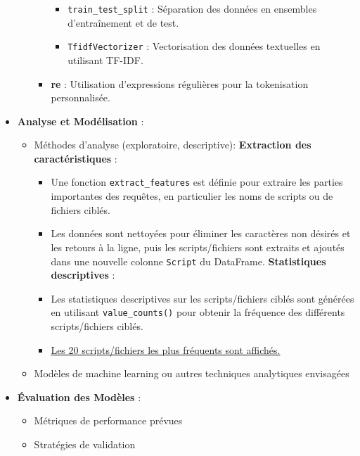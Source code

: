 \documentclass[
  letterpaper,
  DIV=11,
  numbers=noendperiod]{scrartcl}
\providecommand{\tightlist}{%
  \setlength{\itemsep}{0pt}\setlength{\parskip}{0pt}}\usepackage{longtable,booktabs,array}
\begin{document}
\begin{itemize}
\begin{itemize}
\begin{itemize}
      \begin{itemize}
      \tightlist
      \item
        \texttt{train\_test\_split} : Séparation des données en
        ensembles d'entraînement et de test.
      \item
        \texttt{TfidfVectorizer} : Vectorisation des données textuelles
        en utilisant TF-IDF.
      \end{itemize}
    \item
      \textbf{re} : Utilisation d'expressions régulières pour la
      tokenisation personnalisée.
    \end{itemize}
  \end{itemize}
\item
  \textbf{Analyse et Modélisation} :

  \begin{itemize}
  \tightlist
  \item
    Méthodes d'analyse (exploratoire, descriptive): \textbf{Extraction
    des caractéristiques} :

    \begin{itemize}
    \tightlist
    \item
      Une fonction \texttt{extract\_features} est définie pour extraire
      les parties importantes des requêtes, en particulier les noms de
      scripts ou de fichiers ciblés.
    \item
      Les données sont nettoyées pour éliminer les caractères non
      désirés et les retours à la ligne, puis les scripts/fichiers sont
      extraits et ajoutés dans une nouvelle colonne \texttt{Script} du
      DataFrame. \textbf{Statistiques descriptives} :
    \item
      Les statistiques descriptives sur les scripts/fichiers ciblés sont
      générées en utilisant \texttt{value\_counts()} pour obtenir la
      fréquence des différents scripts/fichiers ciblés.
    \item
      \href{images/Fréquence\%20des\%20fichiers\%20scripts\%20ciblés.png}{Les
      20 scripts/fichiers les plus fréquents sont affichés.}
    \end{itemize}
  \item
    Modèles de machine learning ou autres techniques analytiques
    envisagées
  \end{itemize}
\item
  \textbf{Évaluation des Modèles} :

  \begin{itemize}
  \tightlist
  \item
    Métriques de performance prévues
  \item
    Stratégies de validation
  \end{itemize}
\end{itemize}
\end{document}
